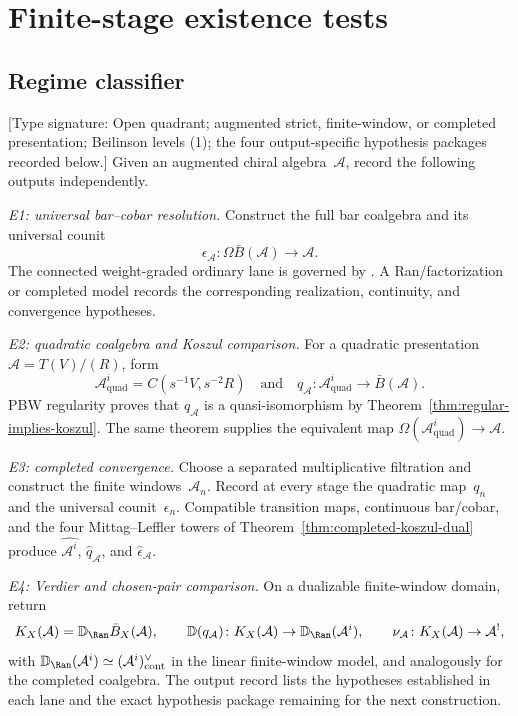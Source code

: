 
\section{Finite-stage existence tests}
\label{sec:algorithmic-test}

\subsection{Regime classifier}

\begin{construction}
\label{con:koszul-dual-existence}
\textup{[Type signature: Open quadrant; augmented strict,
finite-window, or completed presentation; Beilinson levels
(1); the four output-specific hypothesis packages
recorded below.]}
Given an augmented chiral algebra~$\mathcal A$, record the following
outputs independently.

\emph{E1: universal bar--cobar resolution.}
Construct the full bar coalgebra and its universal counit
\[
 \epsilon_{\mathcal A}\colon
 \Omega\bar B(\mathcal A)\longrightarrow\mathcal A.
\]
The connected weight-graded ordinary lane is governed by
\cite[Corollary~2.3.4]{LV12}.  A Ran/factorization or completed model
records the corresponding realization, continuity, and convergence
hypotheses.

\emph{E2: quadratic coalgebra and Koszul comparison.}
For a quadratic presentation $\mathcal A=T(V)/(R)$, form
\[
 \mathcal A^i_{\mathrm{quad}}=C(s^{-1}V,s^{-2}R)
 \quad\text{and}\quad
 q_{\mathcal A}\colon
 \mathcal A^i_{\mathrm{quad}}\longrightarrow\bar B(\mathcal A).
\]
PBW regularity proves that $q_{\mathcal A}$ is a quasi-isomorphism by
Theorem~\ref{thm:regular-implies-koszul}.  The same theorem supplies
the equivalent map $\Omega(\mathcal A^i_{\mathrm{quad}})\to\mathcal A$.

\emph{E3: completed convergence.}
Choose a separated multiplicative filtration and construct the finite
windows~$\mathcal A_n$.  Record at every stage the quadratic map~$q_n$
and the universal counit~$\epsilon_n$.  Compatible transition maps,
continuous bar/cobar, and the four Mittag--Leffler towers of
Theorem~\ref{thm:completed-koszul-dual} produce
$\widehat{\mathcal A^i}$, $\widehat q_{\mathcal A}$, and
$\widehat\epsilon_{\mathcal A}$.

\emph{E4: Verdier and chosen-pair comparison.}
On a dualizable finite-window domain, return
\[
 K_X(\mathcal A)=\mathbb D_{\Ran}\bar B_X(\mathcal A),\qquad
 \mathbb D(q_{\mathcal A})\colon K_X(\mathcal A)\to
 \mathbb D_{\Ran}(\mathcal A^i),\qquad
 \nu_{\mathcal A}\colon K_X(\mathcal A)\to\mathcal A^!,
\]
with
$\mathbb D_{\Ran}(\mathcal A^i)\simeq
(\mathcal A^i)^\vee_{\mathrm{cont}}$ in the linear finite-window
model, and analogously for the completed coalgebra.  The output record lists
the hypotheses established in each lane and the exact hypothesis
package remaining for the next construction.
\end{construction}

